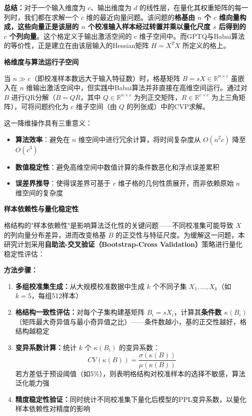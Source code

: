 \documentclass[letterpaper,twocolumn,10pt]{article}
\begin{document}
\textbf{总结：}对于一个输入维度为 $c$、输出维度为 $d$ 的线性层，在量化其权重矩阵的每一列时，我们都在求解一个 $c$ 维的最近向量问题。该问题的\textbf{格基由 $n$ 个 $c$ 维向量构成，这些向量正是该层的 $n$ 个校准输入样本经过转置并乘以量化尺度 $s$ 后得到的 $c$ 个列向量}。这个格定义于输出激活空间的 $c$ 维子空间中。而GPTQ与Babai算法的等价性，正是建立在由该层输入的Hessian矩阵 $H = X^T X$ 所定义的格上。

\textbf{格维度与算法运行子空间}

当 $n \gg c$（即校准样本数远大于输入特征数）时，格基矩阵 $B = sX \in \mathbb{R}^{n \times c}$ 虽嵌入在 $n$ 维输出激活空间中，但实践中Babai算法并非直接在高维空间运行。通过对 $B$ 进行QR分解（$B = QR$，其中 $Q \in \mathbb{R}^{n \times c}$ 为列正交矩阵，$R \in \mathbb{R}^{c \times c}$ 为上三角矩阵），可将问题约化为 $c$ 维子空间（由 $Q$ 的列张成）中的CVP求解。

这一降维操作具有三重意义：
\begin{itemize}
\item \textbf{算法效率}：避免在 $n$ 维空间中进行冗余计算，将时间复杂度从 $O(n^2c)$ 降至 $O(c^3)$
\item \textbf{数值稳定性}：避免高维空间中数值计算的条件数恶化和浮点误差累积
\item \textbf{误差界推导}：使得误差界可基于 $c$ 维子格的几何性质展开，而非依赖原始 $n$ 维空间的复杂度
\end{itemize}

\textbf{样本依赖性与量化稳定性}

格结构的"样本依赖性"是影响算法泛化性的关键问题——不同校准集可能导致 $X$ 的列向量分布差异，进而改变格基 $B$ 的正交性与特征尺度。为缓解这一问题，本研究计划采用\textbf{自助法-交叉验证（Bootstrap-Cross Validation）}策略进行量化稳定性评估：

\textbf{方法步骤：}

\begin{enumerate}
\item \textbf{多组校准集生成：}从大规模校准数据中生成 $k$ 个不同子集 $X_1, ..., X_k$（如 $k=5$，每组512样本）

\item \textbf{格结构一致性评估：}对每个子集构建基矩阵 $B_i = sX_i$，计算其\textbf{条件数 $\kappa(B_i)$}（矩阵最大奇异值与最小奇异值之比）——条件数越小，基的正交性越好，格结构越稳定

\item \textbf{变异系数计算：}统计 $k$ 个 $\kappa(B_i)$ 的变异系数：
$$CV(\kappa(B)) = \frac{\sigma(\kappa(B))}{\mu(\kappa(B))}$$
若方差低于预设阈值（如5\%），则表明格结构对校准样本的选择不敏感，算法泛化能力强

\item \textbf{精度稳定性验证：}同时统计不同校准集下量化后模型的PPL变异系数，以量化样本依赖性对精度的影响
\end{enumerate}
\end{document}
